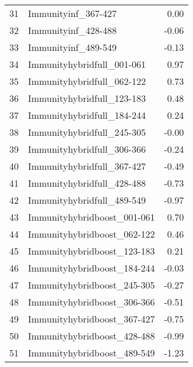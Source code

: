 \begin{table}[ht]
\begin{tabular}{rlr}
  31 & Immunityinf\_367-427 & 0.00 \\ 
  32 & Immunityinf\_428-488 & -0.06 \\ 
  33 & Immunityinf\_489-549 & -0.13 \\ 
  34 & Immunityhybridfull\_001-061 & 0.97 \\ 
  35 & Immunityhybridfull\_062-122 & 0.73 \\ 
  36 & Immunityhybridfull\_123-183 & 0.48 \\ 
  37 & Immunityhybridfull\_184-244 & 0.24 \\ 
  38 & Immunityhybridfull\_245-305 & -0.00 \\ 
  39 & Immunityhybridfull\_306-366 & -0.24 \\ 
  40 & Immunityhybridfull\_367-427 & -0.49 \\ 
  41 & Immunityhybridfull\_428-488 & -0.73 \\ 
  42 & Immunityhybridfull\_489-549 & -0.97 \\ 
  43 & Immunityhybridboost\_001-061 & 0.70 \\ 
  44 & Immunityhybridboost\_062-122 & 0.46 \\ 
  45 & Immunityhybridboost\_123-183 & 0.21 \\ 
  46 & Immunityhybridboost\_184-244 & -0.03 \\ 
  47 & Immunityhybridboost\_245-305 & -0.27 \\ 
  48 & Immunityhybridboost\_306-366 & -0.51 \\ 
  49 & Immunityhybridboost\_367-427 & -0.75 \\ 
  50 & Immunityhybridboost\_428-488 & -0.99 \\ 
  51 & Immunityhybridboost\_489-549 & -1.23 \\ 
   \hline
\end{tabular}
\end{table}
